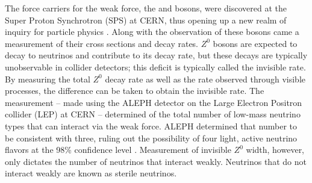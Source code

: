 The force carriers for the weak force, the \wb and \zb bosons, were
discovered at the Super Proton Synchrotron (SPS) at CERN, thus opening up a new
realm of inquiry for particle physics \cite{wBoson, zBoson}.  Along with the
observation of these bosons came a measurement of their cross sections and
decay rates.  $Z^0$ bosons are expected to decay to neutrinos and contribute to
its decay rate, but these decays are typically unobservable in collider
detectors; this deficit is typically called the invisible rate.  By measuring
the total $Z^0$ decay rate as well as the rate observed through visible
processes, the difference can be taken to obtain the invisible rate.  The
measurement -- made using the ALEPH detector on the Large Electron Positron
collider (LEP) at CERN -- determined of the total number of low-mass
neutrino types that can interact via the weak force.
ALEPH determined that number to
be consistent with three, ruling out the possibility of four
light, active neutrino flavors at the 98\% confidence level \cite{aleph}.
Measurement of
invisible $Z^0$ width, however, only dictates the number of neutrinos that
interact weakly.  Neutrinos that do not interact weakly are known as sterile
neutrinos.

